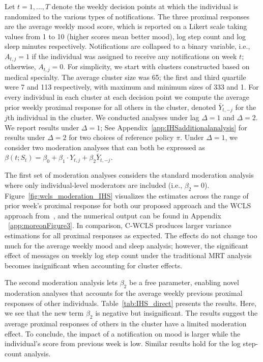 \documentclass[lineno]{biometrika}
\begin{document}
Let $t=1,\ldots,T$ denote the weekly decision points at which the individual is randomized to the various types of notifications.  
The three proximal responses are the average weekly mood score,  which is reported on a Likert scale  taking values from 1 to 10 (higher scores mean better mood), log step count and log sleep minutes respectively.
Notifications are collapsed to a binary variable, i.e., $A_{t,j}=1$ if the individual was assigned to receive any notifications on week $t$; otherwise, $A_{t,j}= 0$.
For simplicity, we start with clusters constructed based on medical specialty.  The average cluster size was 65; the first and third quartile were 7 and 113 respectively, with maximum and minimum sizes of 333 and 1.  For every individual in each cluster at each decision point we compute the average prior weekly proximal response for all others in the cluster, denoted $\bar Y_{t, -j}$ for the $j$th individual in the cluster.  We conducted analyses under lag $\Delta=1$ and $\Delta=2$. We report results under $\Delta=1$; See Appendix~\ref{app:IHSadditionalanalysis} for results under $\Delta=2$ for two choices of reference policy $\pi$. Under $\Delta=1$, we consider two moderation analyses that can both be expressed as
$\beta(t; S_t) = \beta_0 + \beta_1 \cdot Y_{t,j} + \beta_2 \bar Y_{t,-j}$.

The first set of moderation analyses considers the standard moderation analysis where only individual-level moderators are included (i.e., $\beta_2 = 0$). Figure~\ref{fig:wcls_moderation_IHS} visualizes the estimates across the range of prior week's proximal response for both our proposed approach and the WCLS approach from~\cite{Boruvkaetal}, and the numerical output can be found in Appendix ~\ref{app:moreonFigure3}. In comparison, C-WCLS produces larger variance estimations for all proximal responses as expected. The effects do not change too much for the average weekly mood and sleep analysis; however, the significant effect of messages on weekly log step count under the traditional MRT analysis becomes insignificant when accounting for cluster effects.


The second moderation analysis lets $\beta_2$ be a free parameter, enabling novel moderation analyses that accounts for the average weekly previous proximal responses of other individuals.  Table~\ref{tab:IHS_direct} presents the results.  Here, we see that the new term $\beta_2$ is negative but insignificant.  The results suggest the average proximal responses of others in the cluster have a limited moderation effect. To conclude, the impact of a notification on mood is larger while the individual's score from previous week is low.   Similar results hold for the log step-count analysis.
\end{document}
